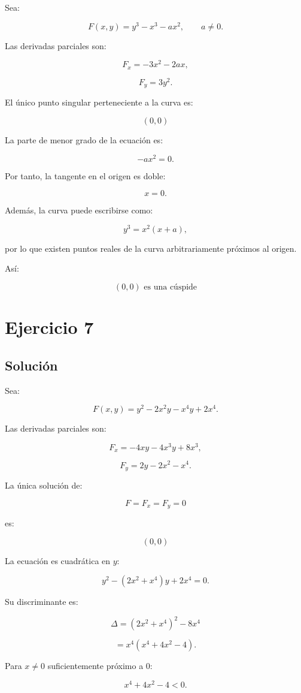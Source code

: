 \documentclass[11pt,a4paper]{article}
\begin{document}
Sea:

\[
F(x,y)
=
y^3-x^3-ax^2,
\qquad
a\neq0.
\]

Las derivadas parciales son:

\[
F_x=-3x^2-2ax,
\]

\[
F_y=3y^2.
\]

El único punto singular perteneciente a la curva es:

\[
\boxed{(0,0)}
\]

La parte de menor grado de la ecuación es:

\[
-ax^2=0.
\]

Por tanto, la tangente en el origen es doble:

\[
x=0.
\]

Además, la curva puede escribirse como:

\[
y^3=x^2(x+a),
\]

por lo que existen puntos reales de la curva arbitrariamente próximos al origen.

Así:

\[
\boxed{
(0,0)\text{ es una cúspide}
}
\]

\section{Ejercicio 7}
\subsection{Solución}

Sea:

\[
F(x,y)
=
y^2-2x^2y-x^4y+2x^4.
\]

Las derivadas parciales son:

\[
F_x
=
-4xy-4x^3y+8x^3,
\]

\[
F_y
=
2y-2x^2-x^4.
\]

La única solución de:

\[
F=F_x=F_y=0
\]

es:

\[
\boxed{(0,0)}
\]

La ecuación es cuadrática en \(y\):

\[
y^2-(2x^2+x^4)y+2x^4=0.
\]

Su discriminante es:

\[
\Delta
=
(2x^2+x^4)^2-8x^4
\]

\[
=
x^4(x^4+4x^2-4).
\]

Para \(x\neq0\) suficientemente próximo a \(0\):

\[
x^4+4x^2-4<0.
\]
\end{document}
